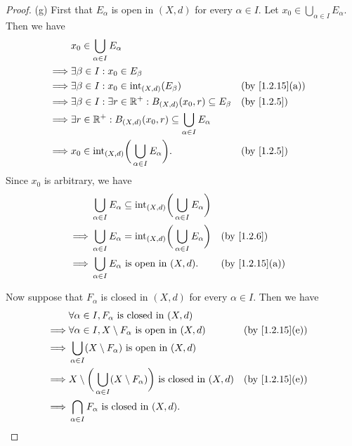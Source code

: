 \begin{proof}{(g)}
  First that \(E_\alpha\) is open in \((X, d)\) for every \(\alpha \in I\).
  Let \(x_0 \in \bigcup_{\alpha \in I} E_\alpha\).
  Then we have
  \begin{align*}
             & x_0 \in \bigcup_{\alpha \in I} E_\alpha                                                                             \\
    \implies & \exists \beta \in I : x_0 \in E_\beta                                                                               \\
    \implies & \exists \beta \in I : x_0 \in \text{int}_{(X, d)}(E_\beta)                        &  & \text{(by \cref{1.2.15}(a))} \\
    \implies & \exists \beta \in I : \exists r \in \R^+ : B_{(X, d)}(x_0, r) \subseteq E_\beta   &  & \by{1.2.5}                   \\
    \implies & \exists r \in \R^+ : B_{(X, d)}(x_0, r) \subseteq \bigcup_{\alpha \in I} E_\alpha                                   \\
    \implies & x_0 \in \text{int}_{(X, d)}\bigg(\bigcup_{\alpha \in I} E_\alpha\bigg).           &  & \by{1.2.5}
  \end{align*}
  Since \(x_0\) is arbitrary, we have
  \begin{align*}
             & \bigcup_{\alpha \in I} E_\alpha \subseteq \text{int}_{(X, d)}\bigg(\bigcup_{\alpha \in I} E_\alpha\bigg)                                   \\
    \implies & \bigcup_{\alpha \in I} E_\alpha = \text{int}_{(X, d)}\bigg(\bigcup_{\alpha \in I} E_\alpha\bigg)         &  & \by{1.2.6}                   \\
    \implies & \bigcup_{\alpha \in I} E_\alpha \text{ is open in } (X, d).                                              &  & \text{(by \cref{1.2.15}(a))}
  \end{align*}

  Now suppose that \(F_\alpha\) is closed in \((X, d)\) for every \(\alpha \in I\).
  Then we have
  \begin{align*}
             & \forall \alpha \in I, F_\alpha \text{ is closed in } (X, d)                                                                          \\
    \implies & \forall \alpha \in I, X \setminus F_\alpha \text{ is open in } (X, d)                              &  & \text{(by \cref{1.2.15}(e))} \\
    \implies & \bigcup_{\alpha \in I} (X \setminus F_\alpha) \text{ is open in } (X, d)                                                             \\
    \implies & X \setminus \bigg(\bigcup_{\alpha \in I} (X \setminus F_\alpha)\bigg) \text{ is closed in } (X, d) &  & \text{(by \cref{1.2.15}(e))} \\
    \implies & \bigcap_{\alpha \in I} F_\alpha \text{ is closed in } (X, d).
  \end{align*}
\end{proof}

